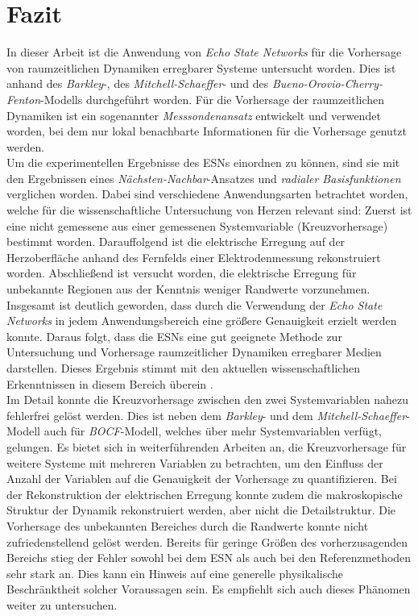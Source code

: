 \chapter{Fazit}
In dieser Arbeit ist die Anwendung von \textit{Echo State Networks} für die Vorhersage von raumzeitlichen Dynamiken erregbarer Systeme untersucht worden. Dies ist anhand des \textit{Barkley}-, des \textit{Mitchell-Schaeffer}- und des \textit{Bueno-Orovio-Cherry-Fenton}-Modells durchgeführt worden. Für die Vorhersage der raumzeitlichen Dynamiken ist ein sogenannter \textit{Messsondenansatz} entwickelt und verwendet worden, bei dem nur lokal benachbarte Informationen für die Vorhersage genutzt werden.\\

Um die experimentellen Ergebnisse des \textsc{ESN}s einordnen zu können, sind sie mit den Ergebnissen eines \textit{Nächsten-Nachbar}-Ansatzes und \textit{radialer Basisfunktionen} verglichen worden. Dabei sind verschiedene Anwendungsarten betrachtet worden, welche für die wissenschaftliche Untersuchung von Herzen relevant sind: Zuerst ist eine nicht gemessene aus einer gemessenen Systemvariable (Kreuzvorhersage) bestimmt worden. Darauffolgend ist die elektrische Erregung auf der Herzoberfläche anhand des Fernfelds einer Elektrodenmessung rekonstruiert worden. Abschließend ist versucht worden, die elektrische Erregung für unbekannte Regionen aus der Kenntnis weniger Randwerte vorzunehmen.\\

Insgesamt ist deutlich geworden, dass durch die Verwendung der \textit{Echo State Networks} in jedem Anwendungsbereich eine größere Genauigkeit erzielt werden konnte. Daraus folgt, dass die \textsc{ESN}s eine gut geeignete Methode zur Untersuchung und Vorhersage raumzeitlicher Dynamiken erregbarer Medien darstellen. Dieses Ergebnis stimmt mit den aktuellen wissenschaftlichen Erkenntnissen in diesem Bereich überein \citep{Lu2017}.\\

Im Detail konnte die Kreuzvorhersage zwischen den zwei Systemvariablen nahezu fehlerfrei gelöst werden. Dies ist neben dem \textit{Barkley}- und dem \textit{Mitchell-Schaeffer}-Modell auch für \textit{BOCF}-Modell, welches über mehr Systemvariablen verfügt, gelungen. Es bietet sich in weiterführenden Arbeiten an, die Kreuzvorhersage für weitere Systeme mit mehreren Variablen zu betrachten, um den Einfluss der Anzahl der Variablen auf die Genauigkeit der Vorhersage zu quantifizieren. Bei der Rekonstruktion der elektrischen Erregung konnte zudem die makroskopische Struktur der Dynamik rekonstruiert werden, aber nicht die Detailstruktur. Die Vorhersage des unbekannten Bereiches durch die Randwerte konnte nicht zufriedenstellend gelöst werden. Bereits für geringe Größen des vorherzusagenden Bereichs stieg der Fehler sowohl bei dem \textsc{ESN} als auch bei den Referenzmethoden sehr stark an. Dies kann ein Hinweis auf eine generelle physikalische Beschränktheit solcher Voraussagen sein. Es empfiehlt sich auch dieses Phänomen weiter zu untersuchen. \\

